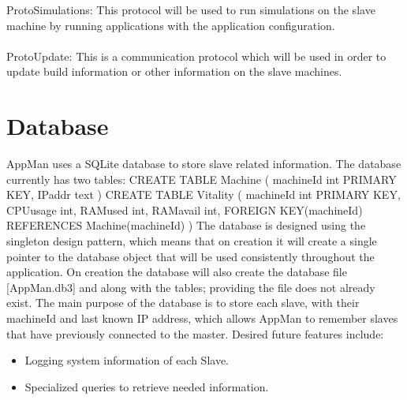 \documentclass[a4paper,12pt,final]{article}
\begin{document}
ProtoSimulations: This protocol will be used to run simulations on the slave machine by running
applications with the application configuration.\\
\textbf{\\}
ProtoUpdate: This is a communication protocol which will be used in order to update build
information or other information on the slave machines.

\section{Database}
AppMan uses a SQLite database to store slave related information. The database currently has two tables:
\newline
\newline
CREATE TABLE Machine ( \newline
	machineId int	PRIMARY KEY, \newline
    IPaddr	text \newline
)
\newline
\newline
CREATE TABLE Vitality ( \newline
	machineId int	PRIMARY KEY, \newline
    CPUusage int, \newline
    RAMused int, \newline
    RAMavail int, \newline
    FOREIGN KEY(machineId) REFERENCES Machine(machineId) \newline
)
\newline
\newline
The database is designed using the singleton design pattern, which means that on creation it will create a single pointer to the database object that will be used consistently throughout the application.
\newline
\newline
On creation the database will also create the database file [AppMan.db3] and along with the tables; providing the file does not already exist.
\newline
\newline
The main purpose of the database is to store each slave, with their machineId and last known IP address, which allows AppMan to remember slaves that have previously connected to the master.
\newline
\newline
Desired future features include:
\begin{itemize}
\item Logging system information of each Slave.
\item Specialized queries to retrieve needed information.
\end{itemize}
\end{document}
